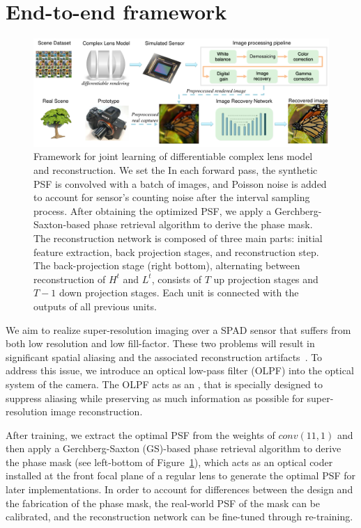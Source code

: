 \section{End-to-end framework}
\begin{figure}[htp!]
\centering
\includegraphics[width=2.1\columnwidth]{figures/E2ELearning.pdf}
    \vspace{-18pt}
\caption{Framework for joint learning of differentiable complex lens model and reconstruction. We set the 
 In each forward pass, the synthetic PSF is convolved with a batch of images, and Poisson noise is added to account for sensor's counting noise after the interval sampling process.
After obtaining the optimized PSF, we apply a Gerchberg-Saxton-based phase retrieval algorithm to derive the phase mask. The reconstruction network is composed of three main parts: initial feature extraction, back projection stages, and reconstruction step. The back-projection stage (right bottom), alternating between reconstruction of $H^t$ and $L^t$, consists of $T$ up projection stages and $T-1$ down projection stages. Each unit is connected with the outputs of all previous units.}
\label{fig:framework}
   \vspace{-5pt}
\end{figure}

We aim to realize super-resolution imaging over a SPAD sensor that
suffers from both low resolution and low fill-factor.  These two
problems will result in significant spatial aliasing and the
associated reconstruction artifacts~\cite{Parker:2017:DSP:3152597}.
To address this issue, we introduce an optical low-pass filter (OLPF)
into the optical system of the camera. The OLPF acts as an
, that is specially designed to suppress
aliasing while preserving as much information as possible for
super-resolution image reconstruction.

After training, we extract the optimal PSF from the weights of
$conv(11,1)$ and then apply a Gerchberg-Saxton (GS)-based phase
retrieval algorithm to derive the phase mask (see left-bottom of
Figure~\ref{fig:framework}), which acts as an optical coder installed
at the front focal plane of a regular lens to generate the optimal PSF
for later implementations. In order to account for differences between
the design and the fabrication of the phase mask, the real-world PSF
of the mask can be calibrated, and the reconstruction network can be
fine-tuned through re-training.

